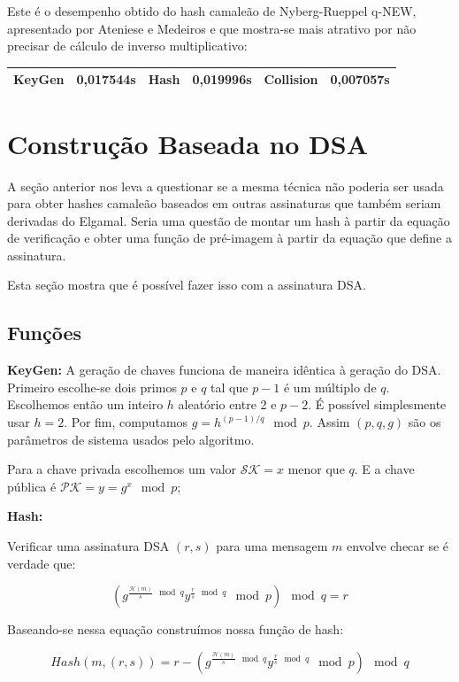 \documentclass[a4paper]{article}
\begin{document}
 Este é o desempenho obtido do hash camaleão de Nyberg-Rueppel q-NEW,
 apresentado por Ateniese e Medeiros e que mostra-se mais atrativo por
 não precisar de cálculo de inverso multiplicativo:
 
 \begin{center}
 \begin{tabular}{|c|c|c|c|c|c|}
 \hline
 KeyGen & 0,017544s & Hash & 0,019996s & Collision & 0,007057s\\
 \hline
 \end{tabular}
 \end{center}
 
 \section{Construção Baseada no DSA}
 
 A seção anterior nos leva a questionar se a mesma técnica não poderia
 ser usada para obter hashes camaleão baseados em outras assinaturas
 que também seriam derivadas do Elgamal. Seria uma questão de montar um
 hash à partir da equação de verificação e obter uma função de
 pré-imagem à partir da equação que define a assinatura.
 
 Esta seção mostra que é possível fazer isso com a assinatura DSA.
 
 \subsection{Funções}
 
 \textbf{KeyGen: } A geração de chaves funciona de maneira idêntica à
 geração do DSA. Primeiro escolhe-se dois primos $p$ e $q$ tal que
 $p-1$ é um múltiplo de $q$. Escolhemos então um inteiro $h$ aleatório
 entre 2 e $p-2$. É possível simplesmente usar $h=2$. Por fim,
 computamos $g=h^{(p-1)/q} \mod p$. Assim $(p, q, g)$ são os parâmetros
 de sistema usados pelo algoritmo.
 
 Para a chave privada escolhemos um valor $\mathcal{SK}=x$ menor que
 $q$. E a chave pública é $\mathcal{PK}=y=g^x \mod p$;
 
 \textbf{Hash:}
 
 Verificar uma assinatura DSA $(r, s)$ para uma mensagem $m$ envolve
 checar se é verdade que:
 
 $$
 (g^{\frac{\mathcal{H}(m)}{s} \mod q}y^{\frac{r}{s} \mod q} \mod p) \mod q = r
 $$
 
 Baseando-se nessa equação construímos nossa função de hash:
 
 $$
 Hash(m, (r, s)) = r - (g^{\frac{\mathcal{H}(m)}{s} \mod q}y^{\frac{r}{s} \mod q} \mod p) \mod q
 $$
 
\end{document}
